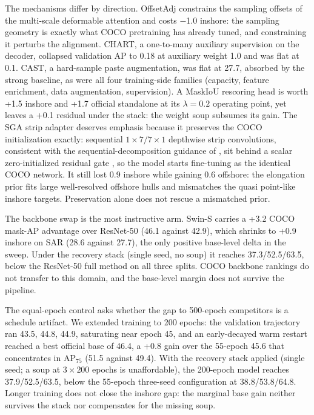 The mechanisms differ by direction. OffsetAdj constrains the sampling offsets of the multi-scale deformable attention and costs $-$1.0 inshore: the sampling geometry is exactly what COCO pretraining has already tuned, and constraining it perturbs the alignment. CHART, a one-to-many auxiliary supervision on the decoder, collapsed validation AP to 0.18 at auxiliary weight 1.0 and was flat at 0.1. CAST, a hard-sample paste augmentation, was flat at 27.7, absorbed by the strong baseline, as were all four training-side families (capacity, feature enrichment, data augmentation, supervision). A MaskIoU rescoring head is worth +1.5 inshore and +1.7 official standalone at its $\lambda=0.2$ operating point, yet leaves a +0.1 residual under the stack: the weight soup subsumes its gain. The SGA strip adapter deserves emphasis because it preserves the COCO initialization exactly: sequential $1\times7/7\times1$ depthwise strip convolutions, consistent with the sequential-decomposition guidance of \cite{striprcnn2026}, sit behind a scalar zero-initialized residual gate \cite{cait2021}, so the model starts fine-tuning as the identical COCO network. It still lost 0.9 inshore while gaining 0.6 offshore: the elongation prior fits large well-resolved offshore hulls and mismatches the quasi point-like inshore targets. Preservation alone does not rescue a mismatched prior.

The backbone swap is the most instructive arm. Swin-S carries a +3.2 COCO mask-AP advantage over ResNet-50 (46.1 against 42.9), which shrinks to +0.9 inshore on SAR (28.6 against 27.7), the only positive base-level delta in the sweep. Under the recovery stack (single seed, no soup) it reaches 37.3/52.5/63.5, below the ResNet-50 full method on all three splits. COCO backbone rankings do not transfer to this domain, and the base-level margin does not survive the pipeline.

The equal-epoch control asks whether the gap to 500-epoch competitors is a schedule artifact. We extended training to 200 epochs: the validation trajectory ran 43.5, 44.8, 44.9, saturating near epoch 45, and an early-decayed warm restart reached a best official base of 46.4, a +0.8 gain over the 55-epoch 45.6 that concentrates in AP$_{75}$ (51.5 against 49.4). With the recovery stack applied (single seed; a soup at $3\times200$ epochs is unaffordable), the 200-epoch model reaches 37.9/52.5/63.5, below the 55-epoch three-seed configuration at 38.8/53.8/64.8. Longer training does not close the inshore gap: the marginal base gain neither survives the stack nor compensates for the missing soup.

